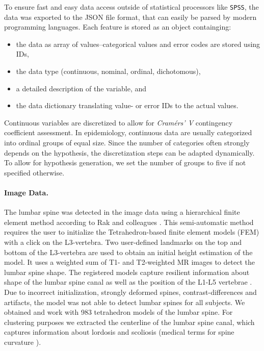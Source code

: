 \documentclass[journal]{style/vgtc} 			          %
\begin{document}
To ensure fast and easy data access outside of statistical processors like \texttt{SPSS}, the data was exported to the JSON file format, that can easily be parsed by modern programming languages.
%
Each feature is stored as an object containging: 
\begin{itemize}
	\item the data as array of values--categorical values and error codes are stored using IDs,
	\item the data type (continuous, nominal, ordinal, dichotomous),
	\item a detailed description of the variable, and
	\item the data dictionary translating value- or error IDs to the actual values.
\end{itemize}
%
Continuous variables are discretized to allow for \emph{Cram\'{e}rs' V} contingency coefficient assessment.
%
In epidemiology, continuous data are usually categorized into ordinal groups of equal size.
%
Since the number of categories often strongly depends on the hypothesis, the discretization steps can be adapted dynamically.
%
To allow for hypothesis generation, we set the number of groups to five if not specified otherwise.

\paragraph{Image Data.} \label{Image-Data}
The lumbar spine was detected in the image data using a hierarchical finite element method according to Rak and colleagues \cite{Rak2013}.
%
This semi-automatic method requires the user to initialize the Tetrahedron-based finite element models (FEM) with a click on the L3-vertebra.
%
Two user-defined landmarks on the top and bottom of the L3-vertebra are used to obtain an initial height estimation of the model.
%
It uses a weighted sum of T1- and T2-weighted MR images to detect the lumbar spine shape.
%
The registered models capture resilient information about shape of the lumbar spine canal as well as the position of the L1-L5 vertebrae \cite{Klemm2013VMV}.
%
Due to incorrect initialization, strongly deformed spines, contrast-differences and artifacts, the model was not able to detect lumbar spines for all subjects.
%
We obtained and work with 983 tetrahedron models of the lumbar spine.
%
For clustering purposes we extracted the centerline of the lumbar spine canal, which captures information about lordosis and scoliosis (medical terms for spine curvature \cite{Klemm2013VMV}).
\end{document}
